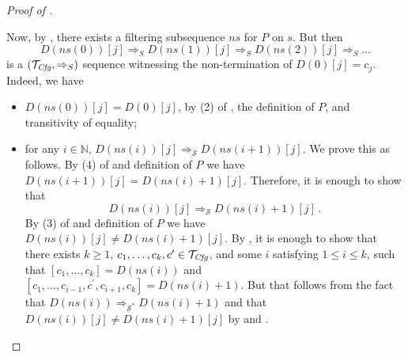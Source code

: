 \begin{proof}[Proof of ]
\begin{itemize}
    Now, by , there exists a filtering subsequence $\mathit{ns}$
    for $P$ on $s$.
    But then
    \begin{equation*}
        D(\mathit{ns}(0))[j] \Rightarrow_S D(\mathit{ns}(1))[j] \Rightarrow_S D(\mathit{ns}(2))[j] \Rightarrow_S \ldots
    \end{equation*}
    is a $(\mathcal{T}_{\mathit{Cfg}}, \Rightarrow_S)$ sequence witnessing the non-termination of $D(0)[j] = c_j$.
    Indeed, we have
    \begin{itemize}
        \item $D(\mathit{ns}(0))[j] = D(0)[j]$, by (2) of , the definition of $P$,
        and transitivity of equality;
        \item for any $i \in \mathbb{N}$, $D(\mathit{ns}(i))[j] \Rightarrow_{\mathcal{S}} D(\mathit{ns}(i+1))[j]$.
        We prove this as follows. By
        (4) of  and definition of $P$ we have
        $D(\mathit{ns}(i+1))[j] = D(\mathit{ns}(i)+1)[j]$.
        Therefore, it is enough to show that
        \begin{equation*}
            D(\mathit{ns}(i))[j] \Rightarrow_{\mathcal{S}} D(\mathit{ns}(i)+1)[j] \, .
        \end{equation*}
        By (3) of  and definition of $P$ we have
        $D(\mathit{ns}(i))[j] \not = D(\mathit{ns}(i)+1)[j]$.
        By , it is enough to show that there exists $k \geq 1$,
        $c_1,\ldots,c_k,c^\prime \in \mathcal{T}_{\mathit{Cfg}}$, and some $i$ satisfying $1 \leq i \leq k$,
        such that
        $[c_1,\ldots,c_k] = D(\mathit{ns}(i))$
        and
        $[c_1,\ldots,c_{i-1},c^\prime,c_{i+1},c_k] = D(\mathit{ns}(i) + 1)$.
        But that follows from the fact that $D(\mathit{ns}(i)) \Rightarrow_{\mathcal{S}^*} D(\mathit{ns}(i) + 1)$
        and that $D(\mathit{ns}(i))[j] \not = D(\mathit{ns}(i)+1)[j]$
        by  and .
    \end{itemize}
\end{itemize}
\end{proof}


